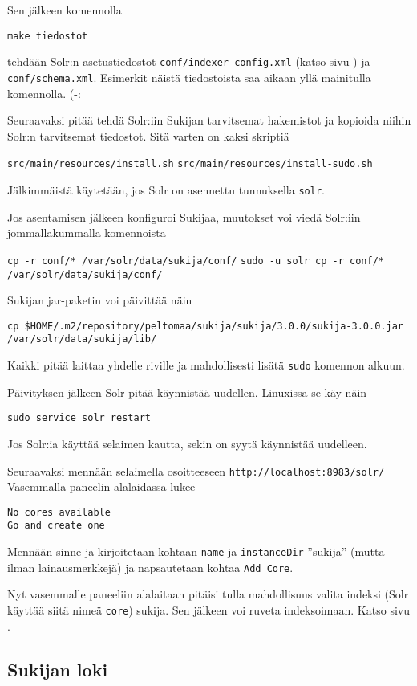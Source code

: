 \documentclass[12pt]{article}
\begin{document}
Sen jälkeen komennolla

\verb|make tiedostot|

tehdään Solr:n asetustiedostot \verb=conf/indexer-config.xml= (katso
sivu ) ja \verb=conf/schema.xml=. Esimerkit näistä
tiedostoista saa aikaan yllä mainitulla komennolla. (-:

Seuraavaksi pitää tehdä Solr:iin Sukijan tarvitsemat hakemistot ja
kopioida niihin Solr:n tarvitsemat tiedostot. Sitä varten on kaksi
skriptiä

\verb=src/main/resources/install.sh=
\verb=src/main/resources/install-sudo.sh=

Jälkimmäistä käytetään, jos Solr on asennettu tunnuksella \verb=solr=.


\bigskip
Jos asentamisen jälkeen konfiguroi Sukijaa, muutokset voi viedä
Solr:iin jommallakummalla komennoista

\verb=cp -r conf/* /var/solr/data/sukija/conf/=
\verb=sudo -u solr cp -r conf/* /var/solr/data/sukija/conf/=

Sukijan jar-paketin voi päivittää näin

\verb=cp $HOME/.m2/repository/peltomaa/sukija/sukija/3.0.0/sukija-3.0.0.jar /var/solr/data/sukija/lib/=

Kaikki pitää laittaa yhdelle riville ja mahdollisesti lisätä
\verb=sudo= komennon alkuun.

Päivityksen jälkeen Solr pitää käynnistää uudellen. Linuxissa se käy
näin

\verb=sudo service solr restart=

Jos Solr:ia käyttää selaimen kautta, sekin on syytä käynnistää
uudelleen.


\bigskip
Seuraavaksi mennään selaimella osoitteeseen \verb=http://localhost:8983/solr/=
Vasemmalla paneelin alalaidassa lukee 

\begin{verbatim}
No cores available
Go and create one
\end{verbatim}

Mennään sinne ja kirjoitetaan kohtaan \verb=name= ja \verb=instanceDir=
''sukija'' (mutta ilman lainausmerkkejä) ja napsautetaan kohtaa
\verb=Add Core=.

Nyt vasemmalle paneeliin alalaitaan pitäisi tulla mahdollisuus valita
indeksi (Solr käyttää siitä nimeä \verb=core=) sukija. Sen jälkeen voi
ruveta indeksoimaan. Katso sivu .


\subsection*{Sukijan loki}
\end{document}
